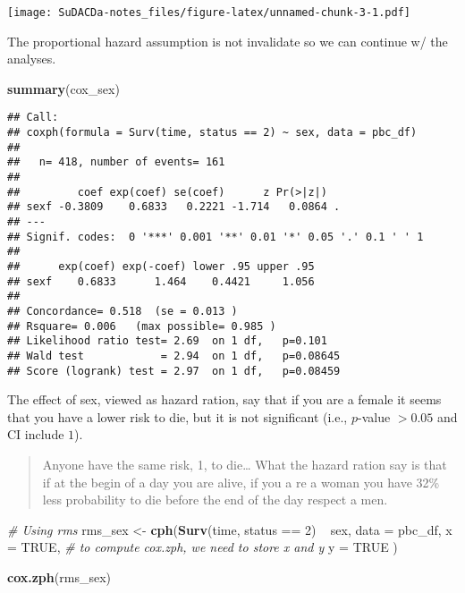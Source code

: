 \documentclass[]{book}
\newenvironment{Shaded}{\begin{snugshade}}{\end{snugshade}}
\newcommand{\KeywordTok}[1]{\textcolor[rgb]{0.13,0.29,0.53}{\textbf{{#1}}}}
\newcommand{\DataTypeTok}[1]{\textcolor[rgb]{0.13,0.29,0.53}{{#1}}}
\newcommand{\DecValTok}[1]{\textcolor[rgb]{0.00,0.00,0.81}{{#1}}}
\newcommand{\StringTok}[1]{\textcolor[rgb]{0.31,0.60,0.02}{{#1}}}
\newcommand{\CommentTok}[1]{\textcolor[rgb]{0.56,0.35,0.01}{\textit{{#1}}}}
\newcommand{\OtherTok}[1]{\textcolor[rgb]{0.56,0.35,0.01}{{#1}}}
\newcommand{\NormalTok}[1]{{#1}}
\theoremstyle{definition}
\theoremstyle{definition}
\theoremstyle{definition}
\theoremstyle{remark}
\begin{document}
\texttt{[image: SuDACDa-notes\_files/figure-latex/unnamed-chunk-3-1.pdf]}

The proportional hazard assumption is not invalidate so we can continue
w/ the analyses.

\begin{Shaded}
\begin{Highlighting}[]
\KeywordTok{summary}\NormalTok{(cox_sex)}
\end{Highlighting}
\end{Shaded}

\begin{verbatim}
## Call:
## coxph(formula = Surv(time, status == 2) ~ sex, data = pbc_df)
## 
##   n= 418, number of events= 161 
## 
##         coef exp(coef) se(coef)      z Pr(>|z|)  
## sexf -0.3809    0.6833   0.2221 -1.714   0.0864 .
## ---
## Signif. codes:  0 '***' 0.001 '**' 0.01 '*' 0.05 '.' 0.1 ' ' 1
## 
##      exp(coef) exp(-coef) lower .95 upper .95
## sexf    0.6833      1.464    0.4421     1.056
## 
## Concordance= 0.518  (se = 0.013 )
## Rsquare= 0.006   (max possible= 0.985 )
## Likelihood ratio test= 2.69  on 1 df,   p=0.101
## Wald test            = 2.94  on 1 df,   p=0.08645
## Score (logrank) test = 2.97  on 1 df,   p=0.08459
\end{verbatim}

The effect of sex, viewed as hazard ration, say that if you are a female
it seems that you have a lower risk to die, but it is not significant
(i.e., \(p\)-value \(> 0.05\) and CI include \(1\)).

\begin{quote}
Anyone have the same risk, 1, to die\ldots{} What the hazard ration say
is that if at the begin of a day you are alive, if you a re a woman you
have 32\% less probability to die before the end of the day respect a
men.
\end{quote}

\begin{Shaded}
\begin{Highlighting}[]
\CommentTok{# Using rms}
\NormalTok{rms_sex <-}\StringTok{ }\KeywordTok{cph}\NormalTok{(}\KeywordTok{Surv}\NormalTok{(time, status ==}\StringTok{ }\DecValTok{2}\NormalTok{) ~}\StringTok{ }\NormalTok{sex,}
  \DataTypeTok{data =} \NormalTok{pbc_df,}
  \DataTypeTok{x    =} \OtherTok{TRUE}\NormalTok{,                    }\CommentTok{# to compute cox.zph, we need to store x and y}
  \DataTypeTok{y    =} \OtherTok{TRUE}
\NormalTok{)}

\KeywordTok{cox.zph}\NormalTok{(rms_sex)}
\end{Highlighting}
\end{Shaded}
\end{document}

